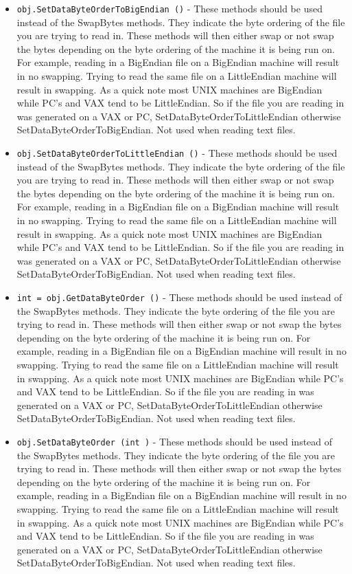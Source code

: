 \begin{itemize}
\item  \verb|obj.SetDataByteOrderToBigEndian ()| -  These methods should be used instead of the SwapBytes methods.
 They indicate the byte ordering of the file you are trying
 to read in. These methods will then either swap or not swap
 the bytes depending on the byte ordering of the machine it is
 being run on. For example, reading in a BigEndian file on a
 BigEndian machine will result in no swapping. Trying to read
 the same file on a LittleEndian machine will result in swapping.
 As a quick note most UNIX machines are BigEndian while PC's
 and VAX tend to be LittleEndian. So if the file you are reading
 in was generated on a VAX or PC, SetDataByteOrderToLittleEndian 
 otherwise SetDataByteOrderToBigEndian. Not used when reading
 text files. 

\item  \verb|obj.SetDataByteOrderToLittleEndian ()| -  These methods should be used instead of the SwapBytes methods.
 They indicate the byte ordering of the file you are trying
 to read in. These methods will then either swap or not swap
 the bytes depending on the byte ordering of the machine it is
 being run on. For example, reading in a BigEndian file on a
 BigEndian machine will result in no swapping. Trying to read
 the same file on a LittleEndian machine will result in swapping.
 As a quick note most UNIX machines are BigEndian while PC's
 and VAX tend to be LittleEndian. So if the file you are reading
 in was generated on a VAX or PC, SetDataByteOrderToLittleEndian 
 otherwise SetDataByteOrderToBigEndian. Not used when reading
 text files. 

\item  \verb|int = obj.GetDataByteOrder ()| -  These methods should be used instead of the SwapBytes methods.
 They indicate the byte ordering of the file you are trying
 to read in. These methods will then either swap or not swap
 the bytes depending on the byte ordering of the machine it is
 being run on. For example, reading in a BigEndian file on a
 BigEndian machine will result in no swapping. Trying to read
 the same file on a LittleEndian machine will result in swapping.
 As a quick note most UNIX machines are BigEndian while PC's
 and VAX tend to be LittleEndian. So if the file you are reading
 in was generated on a VAX or PC, SetDataByteOrderToLittleEndian 
 otherwise SetDataByteOrderToBigEndian. Not used when reading
 text files. 

\item  \verb|obj.SetDataByteOrder (int )| -  These methods should be used instead of the SwapBytes methods.
 They indicate the byte ordering of the file you are trying
 to read in. These methods will then either swap or not swap
 the bytes depending on the byte ordering of the machine it is
 being run on. For example, reading in a BigEndian file on a
 BigEndian machine will result in no swapping. Trying to read
 the same file on a LittleEndian machine will result in swapping.
 As a quick note most UNIX machines are BigEndian while PC's
 and VAX tend to be LittleEndian. So if the file you are reading
 in was generated on a VAX or PC, SetDataByteOrderToLittleEndian 
 otherwise SetDataByteOrderToBigEndian. Not used when reading
 text files. 


\end{itemize}
